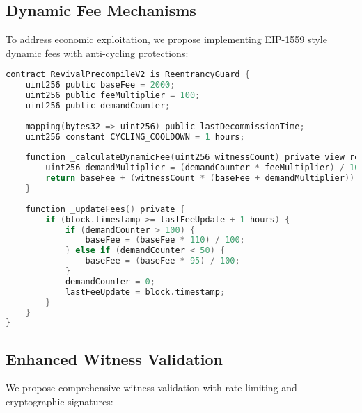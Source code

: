 \documentclass{article}
\begin{document}
\subsection{Dynamic Fee Mechanisms}

To address economic exploitation, we propose implementing EIP-1559 style dynamic fees \cite{eip1559} with anti-cycling protections:

\begin{lstlisting}[language=C,caption={Dynamic Fee Implementation},label={lst:dynamic-fees}]
contract RevivalPrecompileV2 is ReentrancyGuard {
    uint256 public baseFee = 2000;
    uint256 public feeMultiplier = 100;
    uint256 public demandCounter;
    
    mapping(bytes32 => uint256) public lastDecommissionTime;
    uint256 constant CYCLING_COOLDOWN = 1 hours;
    
    function _calculateDynamicFee(uint256 witnessCount) private view returns (uint256) {
        uint256 demandMultiplier = (demandCounter * feeMultiplier) / 10000;
        return baseFee + (witnessCount * (baseFee + demandMultiplier));
    }
    
    function _updateFees() private {
        if (block.timestamp >= lastFeeUpdate + 1 hours) {
            if (demandCounter > 100) {
                baseFee = (baseFee * 110) / 100;
            } else if (demandCounter < 50) {
                baseFee = (baseFee * 95) / 100;
            }
            demandCounter = 0;
            lastFeeUpdate = block.timestamp;
        }
    }
}
\end{lstlisting}

\subsection{Enhanced Witness Validation}

We propose comprehensive witness validation with rate limiting and cryptographic signatures:
\end{document}
